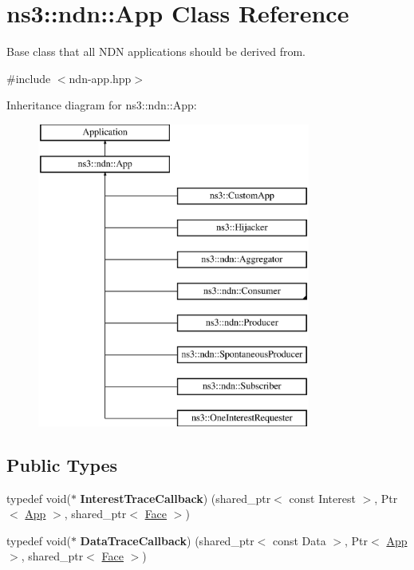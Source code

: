 \hypertarget{classns3_1_1ndn_1_1App}{}\section{ns3\+:\+:ndn\+:\+:App Class Reference}
\label{classns3_1_1ndn_1_1App}


Base class that all N\+DN applications should be derived from.  




{\ttfamily \#include $<$ndn-\/app.\+hpp$>$}

Inheritance diagram for ns3\+:\+:ndn\+:\+:App\+:\begin{figure}[H]
\begin{center}
\leavevmode
\includegraphics[height=10.000000cm]{classns3_1_1ndn_1_1App}
\end{center}
\end{figure}
\subsection*{Public Types}
\begin{DoxyCompactItemize}
\item 
typedef void($\ast$ {\bfseries Interest\+Trace\+Callback}) (shared\+\_\+ptr$<$ const Interest $>$, Ptr$<$ \hyperlink{classns3_1_1ndn_1_1App}{App} $>$, shared\+\_\+ptr$<$ \hyperlink{classnfd_1_1Face}{Face} $>$)\hypertarget{classns3_1_1ndn_1_1App_acdfaca571fefc75291387ee0534f819f}{}\label{classns3_1_1ndn_1_1App_acdfaca571fefc75291387ee0534f819f}

\item 
typedef void($\ast$ {\bfseries Data\+Trace\+Callback}) (shared\+\_\+ptr$<$ const Data $>$, Ptr$<$ \hyperlink{classns3_1_1ndn_1_1App}{App} $>$, shared\+\_\+ptr$<$ \hyperlink{classnfd_1_1Face}{Face} $>$)\hypertarget{classns3_1_1ndn_1_1App_ac786fbfe28ad52a3648a1f95db47a46f}{}\label{classns3_1_1ndn_1_1App_ac786fbfe28ad52a3648a1f95db47a46f}

\end{DoxyCompactItemize}
